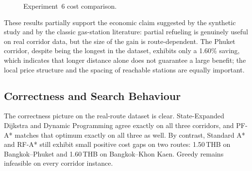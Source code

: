 \begin{figure}[H]
      \centering
      \caption{Experiment~6 cost comparison.}
      \label{fig:exp6_cost_compare}
\end{figure}

These results partially support the economic claim suggested by the synthetic study and by the
classic gas-station literature: partial refueling is genuinely useful on real corridor data,
but the size of the gain is route-dependent.
The Phuket corridor, despite being the longest in the dataset, exhibits only a 1.60\% saving,
which indicates that longer distance alone does not guarantee a large benefit; the local price
structure and the spacing of reachable stations are equally important.

\subsection*{Correctness and Search Behaviour}

The correctness picture on the real-route dataset is clear.
State-Expanded Dijkstra and Dynamic Programming agree exactly on all three corridors, and
PF-A* matches that optimum exactly on all three as well.
By contrast, Standard A* and RF-A* still exhibit small positive cost gaps on two routes:
1.50\,THB on Bangkok--Phuket and 1.60\,THB on Bangkok--Khon Kaen.
Greedy remains infeasible on every corridor instance.

